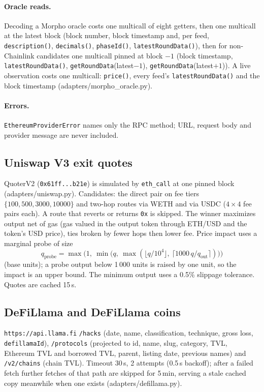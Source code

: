 \documentclass[11pt,a4paper]{article}
\newcommand{\code}[1]{\texttt{#1}}
\newcommand{\src}[1]{\textsf{\small #1}}
\begin{document}
\paragraph{Oracle reads.} Decoding a Morpho oracle costs one multicall of eight
getters, then one multicall at the latest block (block number, block timestamp
and, per feed, \code{description()}, \code{decimals()}, \code{phaseId()},
\code{latestRoundData()}), then for non-Chainlink candidates one multicall pinned
at block $-1$ (block timestamp, \code{latestRoundData()},
\code{getRoundData}(latest$-1$), \code{getRoundData}(latest$+1$)). A live
observation costs one multicall: \code{price()}, every feed's
\code{latestRoundData()} and the block timestamp
(\src{adapters/morpho\_oracle.py}).

\paragraph{Errors.} \code{EthereumProviderError} names only the RPC method; URL,
request body and provider message are never included.

\subsection{Uniswap V3 exit quotes}

QuoterV2 (\code{0x61ff...b21e}) is simulated by \code{eth\_call} at one pinned
block (\src{adapters/uniswap.py}). Candidates: the direct pair on fee tiers
$\{100,500,3000,10000\}$ and two-hop routes via WETH and via USDC
($4\times4$ fee pairs each). A route that reverts or returns \code{0x} is skipped.
The winner maximizes output net of gas (gas valued in the output token through
ETH/USD and the token's USD price), ties broken by fewer hops then lower fee.
Price impact uses a marginal probe of size
\begin{equation}
q_{\text{probe}}=\max\!\Big(1,\ \min\big(q,\ \max(\lfloor q/10^4\rfloor,\ \lceil 1000\,q/q_{\text{out}}\rceil)\big)\Big)
\end{equation}
(base units); a probe output below 1\,000 units is raised by one unit, so the
impact is an upper bound. The minimum output uses a 0.5\% slippage tolerance.
Quotes are cached 15\,s.

\subsection{DeFiLlama and DeFiLlama coins}

\code{https://api.llama.fi} \code{/hacks} (date, name, classification, technique,
gross loss, \code{defillamaId}), \code{/protocols} (projected to id, name, slug,
category, TVL, Ethereum TVL and borrowed TVL, parent, listing date, previous
names) and \code{/v2/chains} (chain TVL). Timeout 30\,s, 2 attempts (0.5\,s
backoff); after a failed fetch further fetches of that path are skipped for
5\,min, serving a stale cached copy meanwhile when one exists
(\src{adapters/defillama.py}).
\end{document}
